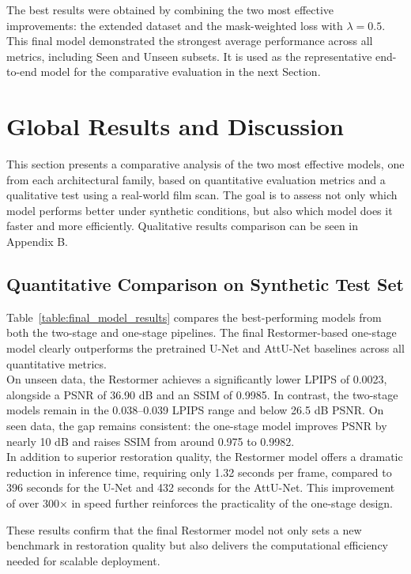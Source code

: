 \documentclass[10pt,a4paper,twocolumn,twoside]{article}
\begin{document}
The best results were obtained by combining the two most effective improvements: the extended dataset and the mask-weighted loss with $\lambda = 0.5$. This final model demonstrated the strongest average performance across all metrics, including Seen and Unseen subsets. It is used as the representative end-to-end model for the comparative evaluation in the next Section.

\section{Global Results and Discussion}
 This section presents a comparative analysis of the two most effective models, one from each architectural family, based on quantitative evaluation metrics and a qualitative test using a real-world film scan. The goal is to assess not only which model performs better under synthetic conditions, but also which model does it faster and more efficiently. Qualitative results comparison can be seen in Appendix B.
\subsection{Quantitative Comparison on Synthetic Test Set}
Table~\ref{table:final_model_results} compares the best-performing models from both the two-stage and one-stage pipelines. The final Restormer-based one-stage model clearly outperforms the pretrained U-Net and AttU-Net baselines across all quantitative metrics. \\
On unseen data, the Restormer achieves a significantly lower LPIPS of 0.0023, alongside a PSNR of 36.90 dB and an SSIM of 0.9985. In contrast, the two-stage models remain in the 0.038–0.039 LPIPS range and below 26.5 dB PSNR. On seen data, the gap remains consistent: the one-stage model improves PSNR by nearly 10 dB and raises SSIM from around 0.975 to 0.9982. \\
In addition to superior restoration quality, the Restormer model offers a dramatic reduction in inference time, requiring only 1.32 seconds per frame, compared to 396 seconds for the U-Net and 432 seconds for the AttU-Net. This improvement of over 300× in speed further reinforces the practicality of the one-stage design. 

These results confirm that the final Restormer model not only sets a new benchmark in restoration quality but also delivers the computational efficiency needed for scalable deployment. 
\end{document}

